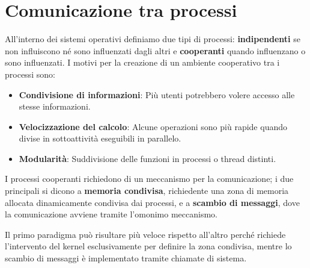 \section{Comunicazione tra processi}
All'interno dei sistemi operativi definiamo due tipi di processi: \textbf{indipendenti} se non influiscono né sono influenzati dagli altri e \textbf{cooperanti} quando influenzano o sono influenzati. I motivi per la creazione di un ambiente cooperativo tra i processi sono: \begin{itemize}
	\item \textbf{Condivisione di informazioni}: Più utenti potrebbero volere accesso alle stesse informazioni.
	\item \textbf{Velocizzazione del calcolo}: Alcune operazioni sono più rapide quando divise in sottoattività eseguibili in parallelo.
	\item \textbf{Modularità}: Suddivisione delle funzioni in processi o thread distinti.
\end{itemize}
\noindent I processi cooperanti richiedono di un meccanismo per la comunicazione; i due principali si dicono a \textbf{memoria condivisa}, richiedente una zona di memoria allocata dinamicamente condivisa dai processi, e a \textbf{scambio di messaggi}, dove la comunicazione avviene tramite l'omonimo meccanismo.\par
Il primo paradigma può risultare più veloce rispetto all'altro perché richiede l'intervento del kernel esclusivamente per definire la zona condivisa, mentre lo scambio di messaggi è implementato tramite chiamate di sistema.\newline

